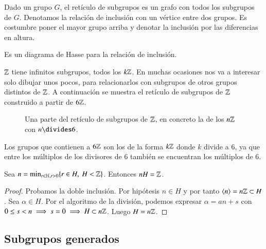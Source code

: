 \begin{dfn}
	Dado un grupo $G$, el retículo de subgrupos es un grafo con todos los subgrupos de $G$. Denotamos la relación de inclusión con un vértice entre dos grupos. Es costumbre poner el mayor grupo arriba y denotar la inclusión por las diferencias en altura.
	
	Es un diagrama de Hasse para la relación de inclusión.
\end{dfn}


\begin{ej}
	$\mathbb{Z}$ tiene infinitos subgrupos, todos los $k\mathbb{Z}$. En muchas ocasiones nos va a interesar solo dibujar unos pocos, para relacionarlos con subgrupos de otros grupos distintos de $\mathbb{Z}$. A continuación se muestra el retículo de subgrupos de $\mathbb{Z}$ construido a partir de $6\mathbb{Z}$.
	
	\begin{figure}[h]
		\centering
		\caption{Una parte del retículo de subgrupos de $\mathbb{Z}$, en concreto la de los $n\mathbb{Z}$ con $n \divides 6$.}
	\end{figure}
	
	Los grupos que contienen a $6\mathbb{Z}$ son los de la forma $k\mathbb{Z}$ donde $k$ divide a $6$, ya que entre los múltiplos de los divisores de $6$ también se encuentran los múltiplos de $6$.
\end{ej}

\begin{pro}
	Sea $n = \min_{r \in \mathbb{N},\\r > 0} \{ r \in H,\ H < \mathbb{Z}\}$. Entonces $nH = \mathbb{Z}$.
\end{pro}
\begin{proof}
	Probamos la doble inclusión. Por hipótesis $n \in H$ y por tanto $\langle n \rangle = n\mathbb{Z} \subset H$. Sea $\alpha \in H$. Por el algoritmo de la división, podemos expresar $\alpha = an + s$ con $0 \leq s < n \implies s = 0 \implies H \subset n\mathbb{Z}$. Luego $H = n\mathbb{Z}$.
\end{proof}

\subsection{Subgrupos generados}


